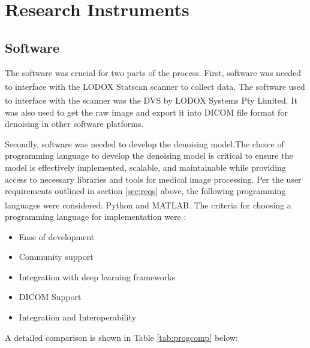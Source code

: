 \section{Research Instruments}
\subsection{Software}
The software was crucial for two parts of the process. First, software was needed to interface with the LODOX\textsuperscript{\textregistered} Statscan\textsuperscript{\textregistered} scanner to collect data. The software used to interface with the scanner was the DVS\textsuperscript{\textregistered} by LODOX\textsuperscript{\textregistered} Systems Pty Limited. It was also used to get the raw image and export it into \gls{DICOM} file format for denoising in other software platforms. 

Secondly, software was needed to develop the denoising model.The choice of programming language to develop the denoising model is critical to ensure the model is effectively implemented, scalable, and maintainable while providing access to necessary libraries and tools for medical image processing. Per the user requirements outlined in section \ref{sec:reqs} above, the following programming languages were considered: Python and MATLAB\textsuperscript{\textregistered}. The criteria for choosing a programming language for implementation were : 

\begin{itemize}
	\item Ease of development
	\item Community support
	\item Integration with deep learning frameworks
	\item \gls{DICOM} Support
	\item Integration and Interoperability
\end{itemize}

A detailed comparison is shown in Table \ref{tab:progcomp} below:

